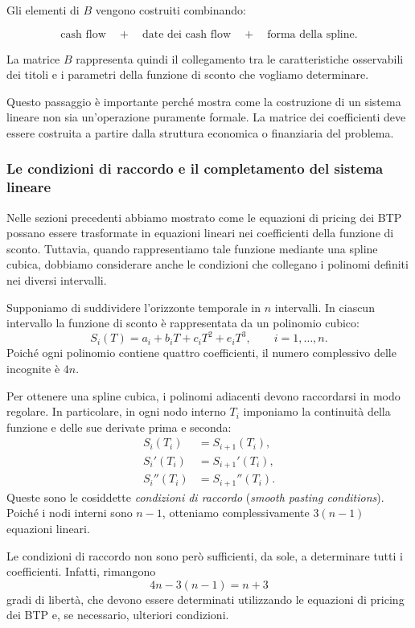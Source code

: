 Gli elementi di $B$ vengono costruiti combinando:

\begin{equation*}
\text{cash flow}
\quad+\quad
\text{date dei cash flow}
\quad+\quad
\text{forma della spline}.
\end{equation*}

La matrice $B$ rappresenta quindi il collegamento tra le
caratteristiche osservabili dei titoli e i parametri della funzione
di sconto che vogliamo determinare.

Questo passaggio è importante perché mostra come la costruzione di
un sistema lineare non sia un'operazione puramente formale.
La matrice dei coefficienti deve essere costruita a partire dalla
struttura economica o finanziaria del problema.



\subsubsection{Le condizioni di raccordo e il completamento del sistema lineare}

Nelle sezioni precedenti abbiamo mostrato come le equazioni di pricing dei BTP possano essere trasformate in equazioni lineari nei coefficienti della funzione di sconto. Tuttavia, quando rappresentiamo tale funzione mediante una spline cubica, dobbiamo considerare anche le condizioni che collegano i polinomi definiti nei diversi intervalli.

Supponiamo di suddividere l'orizzonte temporale in $n$ intervalli. In ciascun intervallo la funzione di sconto è rappresentata da un polinomio cubico:
\[
S_i(T)=a_i+b_iT+c_iT^2+e_iT^3,
\qquad i=1,\ldots,n.
\]
Poiché ogni polinomio contiene quattro coefficienti, il numero complessivo delle incognite è $4n$.

Per ottenere una spline cubica, i polinomi adiacenti devono raccordarsi in modo regolare. In particolare, in ogni nodo interno $T_i$ imponiamo la continuità della funzione e delle sue derivate prima e seconda:
\[
\begin{aligned}
S_i(T_i)&=S_{i+1}(T_i),\\
S_i'(T_i)&=S_{i+1}'(T_i),\\
S_i''(T_i)&=S_{i+1}''(T_i).
\end{aligned}
\]
Queste sono le cosiddette \emph{condizioni di raccordo} (\emph{smooth pasting conditions}). Poiché i nodi interni sono $n-1$, otteniamo complessivamente $3(n-1)$ equazioni lineari.

Le condizioni di raccordo non sono però sufficienti, da sole, a determinare tutti i coefficienti. Infatti, rimangono
\[
4n-3(n-1)=n+3
\]
gradi di libertà, che devono essere determinati utilizzando le equazioni di pricing dei BTP e, se necessario, ulteriori condizioni.

